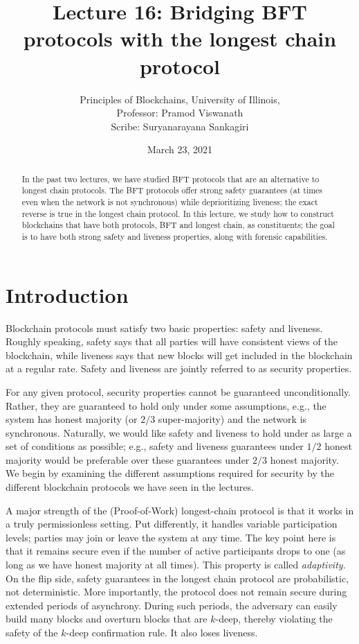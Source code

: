 \documentclass{article}
\title{Lecture 16: Bridging BFT protocols with the longest chain protocol}
\author{Principles of Blockchains, University of Illinois,  \\ Professor:  Pramod Viswanath \\ Scribe:  Suryanarayana Sankagiri}
\date{March 23, 2021}
\begin{document}
\maketitle

\begin{abstract}
In the past two lectures, we have studied BFT protocols that are an alternative to longest chain protocols. The BFT protocols offer strong safety guarantees (at times even when the  network is not synchronous)  while deprioritizing liveness; the exact reverse is true in the longest chain protocol. In this lecture, we study how to construct blockchains that have both protocols, BFT and longest chain, as constituents; the goal is to have both strong safety and liveness properties, along with forensic capabilities. 
\end{abstract}

\section*{Introduction}
Blockchain protocols must satisfy two basic properties: safety and liveness. Roughly speaking, safety says that all parties will have consistent views of the blockchain, while liveness says that new blocks will get included in the blockchain at a regular rate. Safety and liveness are jointly referred to as security properties.

For any given protocol, security properties cannot be guaranteed unconditionally. Rather, they are guaranteed to hold only under some assumptions, e.g.,  the system has honest majority (or $2/3$ super-majority) and the network is synchronous. Naturally, we would like safety and liveness to hold under as large a set of conditions as possible; e.g., safety and liveness guarantees under $1/2$ honest majority would be preferable over these guarantees under $2/3$ honest majority. We begin by examining the different assumptions required for security by the different blockchain protocols we have seen in the lectures.

A major strength of the (Proof-of-Work) longest-chain protocol is that it works in a truly permissionless setting. Put differently, it handles variable participation levels; parties may join or leave the system at any time. The key point here is that it remains secure even if the number of active participants drops to one (as long as we have honest majority at all times). This property is called {\em adaptivity}. %
On the flip side, safety guarantees in the longest chain protocol are probabilistic, not deterministic. More importantly, the protocol does not remain secure during extended periods of asynchrony. During such periods, the adversary can easily build many blocks and overturn blocks that are $k$-deep, thereby violating the safety of the $k$-deep confirmation rule. It also loses liveness.
\end{document}
